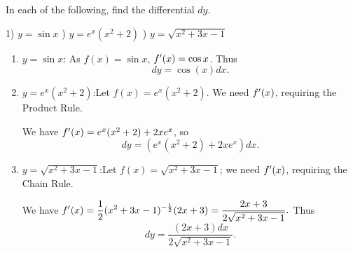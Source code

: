 \begin{example} \label{Ex:3.6.Eg3}
In each of the following, find the differential $dy$.
\begin{center}
1) $y = \sin x$ \qquad{}) $y = e^x(x^2+2)$ \quad{}) $y = \sqrt{x^2+3x-1}$
\end{center}

\solution
\begin{enumerate}[1)]
\item $y = \sin x$:	\quad As $f(x) = \sin x$, $f'(x) = \cos x$. Thus $$dy = \cos (x)dx.$$

\item $y = e^x(x^2+2)$:\quad Let $f(x) = e^x(x^2+2)$. We need $f'(x)$, requiring the Product Rule. 

We have $f'(x) = e^x(x^2+2) + 2xe^x$, so $$dy = (e^x(x^2+2) + 2xe^x)dx.$$

\item $y = \sqrt{x^2+3x-1}$:\quad	Let $f(x) = \sqrt{x^2+3x-1}$; we need $f'(x)$, requiring the Chain Rule.

We have $\displaystyle f'(x) = \frac{1}{2}(x^2+3x-1)^{-\frac12}(2x+3) = \frac{2x+3}{2\sqrt{x^2+3x-1}}.$ Thus 
$$ dy = \frac{(2x+3)dx}{2\sqrt{x^2+3x-1}}.$$
\end{enumerate}
\end{example}